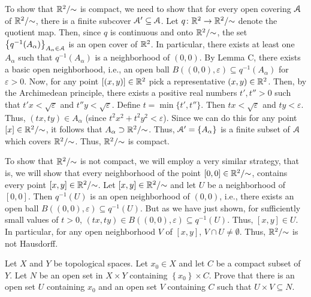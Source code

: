 \begin{solution}
  To show that $\mathbb{R}^2/{\sim}$ is compact, we need to show that for every
  open covering $\mathcal{A}$ of $\mathbb{R}^2/{\sim}$, there is a finite subcover
  $\mathcal{A}'\subseteq\mathcal{A}$. Let $q\colon\mathbb{R}^2\to\mathbb{R}^2/{\sim}$ denote the
  quotient map. Then, since $q$ is continuous and onto $\mathbb{R}^2/{\sim}$, the
  set $\left\{q^{-1}(A_\alpha)\right\}_{A_\alpha\in\mathcal{A}}$ is an open cover
  of $\mathbb{R}^2$. In particular, there exists at least one $A_\alpha$ such
  that $q^{-1}(A_\alpha)$ is a neighborhood of $(0,0)$. By Lemma C, there
  exists a basic open neighborhood, i.e., an open ball
  $B((0,0),\varepsilon)\subseteq q^{-1}(A_\alpha)$ for $\varepsilon>0$. Now,
  for any point $[(x,y)]\in\mathbb{R}^2$ pick a representative
  $(x,y)\in\mathbb{R}^2$. Then, by the Archimedean principle, there exists a
  positive real numbers $t',t''>0$ such that $t'x<\sqrt{\varepsilon}$ and
  $t''y<\sqrt{\varepsilon}$. Define $t=\min\{t',t''\}$. Then
  $tx<\sqrt{\varepsilon}$ and $ty<\varepsilon$. Thus, $(tx,ty)\in A_\alpha$
  (since $t^2x^2+t^2y^2<\varepsilon$). Since we can do this for any point
  $[x]\in\mathbb{R}^2/{\sim}$, it follows that
  $A_\alpha\supset\mathbb{R}^2/{\sim}$. Thus, $\mathcal{A}'=\left\{A_\alpha\right\}$ is
  a finite subset of $\mathcal{A}$ which covers $\mathbb{R}^2/{\sim}$. Thus,
  $\mathbb{R}^2/{\sim}$ is compact.

  To show that $\mathbb{R}^2/{\sim}$ is not compact, we will employ a very
  similar strategy, that is, we will show that every neighborhood of the
  point $[0,0]\in\mathbb{R}^2/{\sim}$, contains every point
  $[x,y]\in\mathbb{R}^2/{\sim}$. Let $[x,y]\in\mathbb{R}^2/{\sim}$ and let $U$ be a
  neighborhood of $[0,0]$. Then $q^{-1}(U)$ is an open neighborhood of
  $(0,0)$, i.e., there exists an open ball
  $B((0,0),\varepsilon)\subseteq q^{-1}(U)$. But as we have just shown, for
  sufficiently small values of $t>0$,
  $(tx,ty)\in B((0,0),\varepsilon)\subseteq q^{-1}(U)$. Thus, $[x,y]\in
  U$. In particular, for any open neighborhood $V$ of $[x,y]$,
  $V\cap U\neq\emptyset$. Thus, $\mathbb{R}^2/{\sim}$ is not Hausdorff.
\end{solution}
\begin{problem}
  Let $X$ and $Y$ be topological spaces. Let $x_0\in X$ and let $C$ be a
  compact subset of $Y$. Let $N$ be an open set in $X\times Y$ containing
  $\left\{x_0\right\}\times C$. Prove that there is an open set $U$
  containing $x_0$ and an open set $V$ containing $C$ such that
  $U\times V\subseteq N$.
\end{problem}
